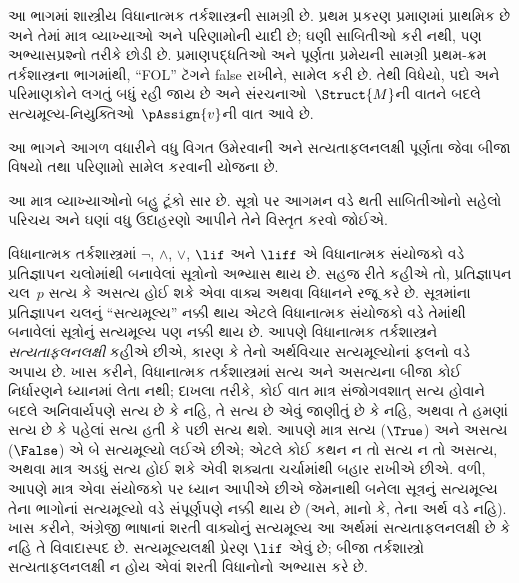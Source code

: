 
\label{guunit:OLP-0055}


\begin{editorial}
  આ ભાગમાં શાસ્ત્રીય વિધાનાત્મક તર્કશાસ્ત્રની સામગ્રી છે. પ્રથમ પ્રકરણ
  પ્રમાણમાં પ્રાથમિક છે અને તેમાં માત્ર વ્યાખ્યાઓ અને પરિણામોની યાદી છે;
  ઘણી સાબિતીઓ કરી નથી, પણ અભ્યાસપ્રશ્નો તરીકે છોડી છે. પ્રમાણપદ્ધતિઓ
  અને પૂર્ણતા પ્રમેયની સામગ્રી પ્રથમ-ક્રમ તર્કશાસ્ત્રના ભાગમાંથી,
  ``FOL'' ટૅગને false રાખીને, સામેલ કરી છે. તેથી વિધેયો, પદો અને
  પરિમાણકોને લગતું બધું રહી જાય છે અને સંરચનાઓ~$\Struct{M}$ની
  વાતને બદલે સત્યમૂલ્ય-નિયુક્તિઓ~$\pAssign{v}$ની વાત આવે છે.

  આ ભાગને આગળ વધારીને વધુ વિગત ઉમેરવાની અને સત્યતાફલનલક્ષી પૂર્ણતા
  જેવા બીજા વિષયો તથા પરિણામો સામેલ કરવાની યોજના છે.
\end{editorial}

\begingroup
\makeatletter{}\makeatother

\label{guunit:OLP-0056}


\begin{editorial}
  આ માત્ર વ્યાખ્યાઓનો બહુ ટૂંકો સાર છે. સૂત્રો પર આગમન વડે થતી
  સાબિતીઓનો સહેલો પરિચય અને ઘણાં વધુ ઉદાહરણો આપીને તેને વિસ્તૃત
  કરવો જોઈએ.
\end{editorial}

\begingroup
\makeatletter{}\makeatother


\label{guunit:OLP-0057}


વિધાનાત્મક તર્કશાસ્ત્રમાં $\lnot$, $\land$, $\lor$, $\lif$ અને
$\liff$ એ વિધાનાત્મક સંયોજકો વડે પ્રતિજ્ઞાપન ચલોમાંથી
બનાવેલાં સૂત્રોનો અભ્યાસ થાય છે. સહજ રીતે કહીએ તો,
પ્રતિજ્ઞાપન ચલ~$p$ સત્ય કે અસત્ય હોઈ શકે એવા વાક્ય
અથવા વિધાનને રજૂ કરે છે. સૂત્રમાંના પ્રતિજ્ઞાપન ચલનું
``સત્યમૂલ્ય'' નક્કી થાય એટલે વિધાનાત્મક સંયોજકો વડે તેમાંથી બનાવેલાં
સૂત્રોનું સત્યમૂલ્ય પણ નક્કી થાય છે. આપણે
વિધાનાત્મક તર્કશાસ્ત્રને \emph{સત્યતાફલનલક્ષી} કહીએ છીએ, કારણ કે તેનો
અર્થવિચાર સત્યમૂલ્યોનાં ફલનો વડે અપાય છે. ખાસ કરીને, વિધાનાત્મક
તર્કશાસ્ત્રમાં સત્ય અને અસત્યના બીજા કોઈ નિર્ધારણને ધ્યાનમાં લેતા નથી;
દાખલા તરીકે, કોઈ વાત માત્ર સંજોગવશાત્ સત્ય હોવાને બદલે અનિવાર્યપણે
સત્ય છે કે નહિ, તે સત્ય છે એવું જાણીતું છે કે નહિ, અથવા તે હમણાં
સત્ય છે કે પહેલાં સત્ય હતી કે પછી સત્ય થશે. આપણે માત્ર સત્ય
($\True$) અને અસત્ય ($\False$) એ બે સત્યમૂલ્યો લઈએ છીએ; એટલે કોઈ
કથન ન તો સત્ય ન તો અસત્ય, અથવા માત્ર અડધું સત્ય હોઈ શકે એવી શક્યતા
ચર્ચામાંથી બહાર રાખીએ છીએ. વળી, આપણે માત્ર એવા સંયોજકો પર ધ્યાન
આપીએ છીએ જેમનાથી બનેલા સૂત્રનું સત્યમૂલ્ય તેના ભાગોનાં
સત્યમૂલ્યો વડે સંપૂર્ણપણે નક્કી થાય છે (અને, માનો કે, તેના અર્થ વડે
નહિ). ખાસ કરીને, અંગ્રેજી ભાષાનાં શરતી વાક્યોનું સત્યમૂલ્ય આ અર્થમાં
સત્યતાફલનલક્ષી છે કે નહિ તે વિવાદાસ્પદ છે. સત્યમૂલ્યલક્ષી પ્રેરણ
$\lif$ એવું છે; બીજા તર્કશાસ્ત્રો સત્યતાફલનલક્ષી ન હોય એવાં શરતી
વિધાનોનો અભ્યાસ કરે છે.

